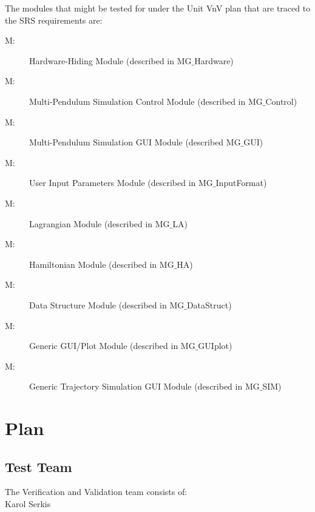 \documentclass[12pt, titlepage]{article}
\newcounter{mnum}
\newcommand{\mthemnum}{M\themnum}
\newcommand{\progname}{Multi-Pendulum Simulation }
\begin{document}
The modules that might be tested for under the Unit VnV plan that are traced to the SRS requirements are:
\begin{description}
\item [ \mthemnum \label{mHH}:] Hardware-Hiding Module (described in MG$\_$Hardware)
\item [ \mthemnum \label{mHH}:] \progname Control Module (described in MG$\_$Control)
\item [ \mthemnum \label{mHH}:] \progname GUI Module (described MG$\_$GUI)
\item [ \mthemnum \label{mHH}:] User Input Parameters Module (described in MG$\_$InputFormat)
\item [ \mthemnum \label{mHH}:] Lagrangian Module (described in MG$\_$LA)
\item [ \mthemnum \label{mHH}:] Hamiltonian Module (described in MG$\_$HA)
\item [ \mthemnum \label{mHH}:] Data Structure Module (described in MG$\_$DataStruct)
\item [ \mthemnum \label{mHH}:] Generic GUI/Plot Module (described in MG$\_$GUIplot)
\item [ \mthemnum \label{mHH}:] Generic Trajectory Simulation GUI Module (described in MG$\_$SIM)
\end{description}


\section{Plan}
	

\subsection{Test Team}

The Verification and Validation team consists of:\\
Karol Serkis
\end{document}
